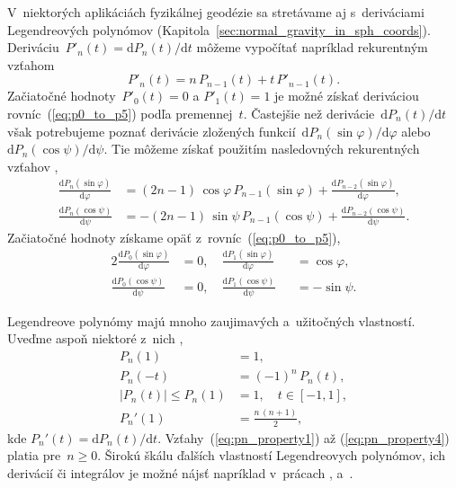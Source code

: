 \documentclass[a4paper, 12pt]{book}
\newcommand{\diff}{\mathrm d}
\begin{document}
V~niektorých aplikáciách fyzikálnej geodézie sa stretávame aj s~deriváciami 
Legendreových polynómov (Kapitola~\ref{sec:normal_gravity_in_sph_coords}).  
Deriváciu~$P'_n(t) = \diff P_n(t) \slash \diff t$ môžeme vypočítať napríklad 
rekurentným vzťahom \parencite{Freeden2009}
%
\begin{equation}
P'_n(t) = n \, P_{n - 1}(t) + t \, P'_{n - 1}(t){.}
\end{equation}
%
Začiatočné hodnoty~$P'_0(t) = 0$ a $P'_1(t) = 1$ je možné získať deriváciou 
rovníc~(\ref{eq:p0_to_p5}) podľa premennej~$t$.  Častejšie než derivácie~$\diff 
P_n(t) \slash \diff t$ však potrebujeme poznať derivácie zložených 
funkcií~$\diff P_n(\sin\varphi) \slash \diff \varphi$ alebo~$\diff 
P_n(\cos\psi) \slash \diff \psi$.  Tie môžeme získať použitím nasledovných 
rekurentných vzťahov \parencite{Tscherning1976b},
%
\begin{align}
\label{eq:dlpsinphi_dphi}
\frac{\diff P_n(\sin\varphi)}{\diff \varphi} &= (2n - 1) \, \cos\varphi \, P_{n 
- 1}(\sin\varphi) + \frac{\diff P_{n - 2}(\sin\varphi)}{\diff \varphi}{,}\\
%
\label{eq:dlpcospsi_dpsi}
\frac{\diff P_n(\cos\psi)}{\diff \psi} &= -(2n - 1) \, \sin\psi \, P_{n 
- 1}(\cos\psi) + \frac{\diff P_{n - 2}(\cos\psi)}{\diff \psi}{.}
\end{align}
%
Začiatočné hodnoty získame opäť z~rovníc~(\ref{eq:p0_to_p5}),
%
\begin{alignat}{2}
\frac{\diff P_0(\sin\varphi)}{\diff \varphi} &= 0{,} \quad \frac{\diff 
P_1(\sin\varphi)}{\diff \varphi} &&= \cos\varphi{,}\\
%
\frac{\diff P_0(\cos\psi)}{\diff \psi} &= 0{,} \quad \frac{\diff 
P_1(\cos\psi)}{\diff \psi} &&= -\sin\psi{.}
\end{alignat}

Legendreove polynómy majú mnoho zaujimavých a~užitočných vlastností.  Uveďme 
aspoň niektoré z~nich \parencite{Freeden2009},
%
\begin{align}
\label{eq:pn_property1}
P_n(1) &= 1{,}\\
%
\label{eq:pn_property2}
P_n(-t) &= (-1)^n \, P_n(t){,}\\
%
\label{eq:pn_property3}
|P_n(t)| \leq P_n(1) &= 1{,} \quad t \in [-1, 1]{,}\\
%
\label{eq:pn_property4}
P_n'(1) &= \frac{n \, (n + 1)}{2}{,}
\end{align}
%
kde $P_n'(t) = \diff P_n(t) \slash \diff t$.  Vzťahy~(\ref{eq:pn_property1}) až
(\ref{eq:pn_property4}) platia pre~$n \geq 0$.   Širokú škálu ďalších
vlastností Legendreovych polynómov, ich derivácií či integrálov je možné nájsť
napríklad v~prácach \textcite{Gradshteyn2007}, \textcite{Freeden2009}
a~\textcite{Olver2010}.
\end{document}
